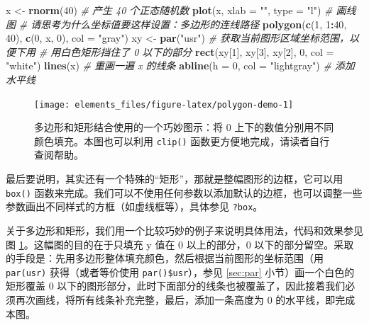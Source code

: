 \documentclass[
  b5paper,
  UTF8,twoside]{book}
\newenvironment{Shaded}{\begin{snugshade}}{\end{snugshade}}
\newcommand{\AttributeTok}[1]{\textcolor[rgb]{0.13,0.29,0.53}{#1}}
\newcommand{\CommentTok}[1]{\textcolor[rgb]{0.56,0.35,0.01}{\textit{#1}}}
\newcommand{\DecValTok}[1]{\textcolor[rgb]{0.00,0.00,0.81}{#1}}
\newcommand{\FunctionTok}[1]{\textcolor[rgb]{0.13,0.29,0.53}{\textbf{#1}}}
\newcommand{\NormalTok}[1]{#1}
\newcommand{\OtherTok}[1]{\textcolor[rgb]{0.56,0.35,0.01}{#1}}
\newcommand{\SpecialCharTok}[1]{\textcolor[rgb]{0.81,0.36,0.00}{\textbf{#1}}}
\newcommand{\StringTok}[1]{\textcolor[rgb]{0.31,0.60,0.02}{#1}}
\begin{document}
\begin{Shaded}
\begin{Highlighting}[]
\NormalTok{x }\OtherTok{\textless{}{-}} \FunctionTok{rnorm}\NormalTok{(}\DecValTok{40}\NormalTok{) }\CommentTok{\# 产生 40 个正态随机数}
\FunctionTok{plot}\NormalTok{(x, }\AttributeTok{xlab =} \StringTok{""}\NormalTok{, }\AttributeTok{type =} \StringTok{"l"}\NormalTok{) }\CommentTok{\# 画线图}
\CommentTok{\# 请思考为什么坐标值要这样设置：多边形的连线路径}
\FunctionTok{polygon}\NormalTok{(}\FunctionTok{c}\NormalTok{(}\DecValTok{1}\NormalTok{, }\DecValTok{1}\SpecialCharTok{:}\DecValTok{40}\NormalTok{, }\DecValTok{40}\NormalTok{), }\FunctionTok{c}\NormalTok{(}\DecValTok{0}\NormalTok{, x, }\DecValTok{0}\NormalTok{), }\AttributeTok{col =} \StringTok{"gray"}\NormalTok{)}
\NormalTok{xy }\OtherTok{\textless{}{-}} \FunctionTok{par}\NormalTok{(}\StringTok{"usr"}\NormalTok{) }\CommentTok{\# 获取当前图形区域坐标范围，以便下用}
\CommentTok{\# 用白色矩形挡住了 0 以下的部分}
\FunctionTok{rect}\NormalTok{(xy[}\DecValTok{1}\NormalTok{], xy[}\DecValTok{3}\NormalTok{], xy[}\DecValTok{2}\NormalTok{], }\DecValTok{0}\NormalTok{, }\AttributeTok{col =} \StringTok{"white"}\NormalTok{)}
\FunctionTok{lines}\NormalTok{(x) }\CommentTok{\# 重画一遍 x 的线条}
\FunctionTok{abline}\NormalTok{(}\AttributeTok{h =} \DecValTok{0}\NormalTok{, }\AttributeTok{col =} \StringTok{"lightgray"}\NormalTok{) }\CommentTok{\# 添加水平线}
\end{Highlighting}
\end{Shaded}

\begin{figure}

{\centering \texttt{[image: elements\_files/figure-latex/polygon-demo-1]} 

}

\caption[多边形和矩形结合使用的一个巧妙图示]{多边形和矩形结合使用的一个巧妙图示：将 0 上下的数值分别用不同颜色填充。本图也可以利用 \texttt{clip()} 函数更方便地完成，请读者自行查阅帮助。}\label{fig:polygon-demo}
\end{figure}





最后要说明，其实还有一个特殊的``矩形''，那就是整幅图形的边框，它可以用 \texttt{box()} 函数来完成。我们可以不使用任何参数以添加默认的边框，也可以调整一些参数画出不同样式的方框（如虚线框等），具体参见 \texttt{?box}。

关于多边形和矩形，我们用一个比较巧妙的例子来说明具体用法，代码和效果参见图 \ref{fig:polygon-demo}。这幅图的目的在于只填充 y 值在 0 以上的部分，0 以下的部分留空。采取的手段是：先用多边形整体填充颜色，然后根据当前图形的坐标范围（用 \texttt{par(\textquotesingle{}usr\textquotesingle{})} 获得（或者等价使用 \texttt{par()\$usr}），参见 \ref{sec:par} 小节）画一个白色的矩形覆盖 0 以下的图形部分，此时下面部分的线条也被覆盖了，因此接着我们必须再次画线，将所有线条补充完整，最后，添加一条高度为 0 的水平线，即完成本图。
\end{document}
